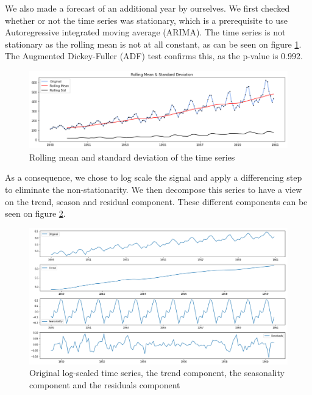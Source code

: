 \documentclass[a4paper, 10pt, conference]{ieeeconf}
\begin{document}
We also made a forecast of an additional year by ourselves. We first checked whether or not the time series was stationary, which is a prerequisite to use Autoregressive integrated moving average (ARIMA). The time series is not stationary as the rolling mean is not at all constant, as can be seen on figure \ref{fig:airpax_rolling_mean}. The Augmented Dickey-Fuller (ADF) test confirms this, as the p-value is 0.992.

\begin{figure}[!ht]
    \centering
    \includegraphics[width=\linewidth]{report/images/airpax_rolling_mean.png}
    \caption{Rolling mean and standard deviation of the time series}
    \label{fig:airpax_rolling_mean}
\end{figure}

As a consequence, we chose to log scale the signal and apply a differencing step to eliminate the non-stationarity. We then decompose this series to have a view on the trend, season and residual component. These different components can be seen on figure \ref{fig:airpax_log_decomp}.

\begin{figure}[!ht]
    \centering
    \includegraphics[width=\linewidth]{report/images/airpax_log_decomp.png}
    \caption{Original log-scaled time series, the trend component, the seasonality component and the residuals component}
    \label{fig:airpax_log_decomp}
\end{figure}
\end{document}
